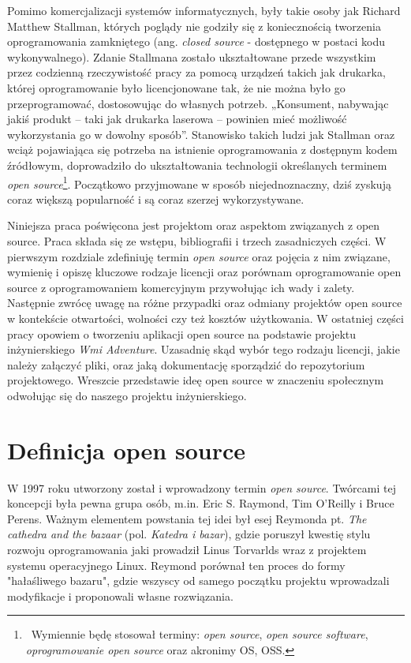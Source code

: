 \documentclass{article}
\begin{document}
Pomimo komercjalizacji systemów informatycznych, były takie osoby jak Richard Matthew Stallman, których poglądy nie godziły się z koniecznością tworzenia oprogramowania zamkniętego (ang. \emph{closed source} - dostępnego w postaci kodu wykonywalnego). Zdanie Stallmana zostało ukształtowane przede wszystkim przez codzienną rzeczywistość pracy za pomocą urządzeń takich jak drukarka, której oprogramowanie było licencjonowane tak, że nie można było go przeprogramować, dostosowując do własnych potrzeb. „Konsument, nabywając jakiś produkt – taki jak drukarka laserowa – powinien mieć możliwość wykorzystania go w dowolny sposób”\cite{Kotula}. Stanowisko takich ludzi jak Stallman oraz wciąż pojawiająca się potrzeba na istnienie oprogramowania z dostępnym kodem źródłowym, doprowadziło do ukształtowania technologii określanych terminem \emph{open source}\footnote{\, Wymiennie będę stosował terminy: \emph{open source}, \emph{open source software}, \emph{oprogramowanie open source} oraz akronimy OS, OSS.}. Początkowo przyjmowane w sposób niejednoznaczny, dziś zyskują coraz większą popularność i są coraz szerzej wykorzystywane\cite{Kotula}. 

Niniejsza praca poświęcona jest projektom oraz aspektom związanych z open source. Praca składa się ze wstępu, bibliografii i trzech zasadniczych części. W pierwszym rozdziale zdefiniuję termin \emph{open source} oraz pojęcia z nim związane, wymienię i opiszę kluczowe rodzaje licencji oraz porównam oprogramowanie open source z oprogramowaniem komercyjnym przywołując ich wady i zalety. Następnie zwrócę uwagę na różne przypadki oraz odmiany projektów open source w kontekście otwartości, wolności czy też kosztów użytkowania. W ostatniej części pracy opowiem o tworzeniu aplikacji open source na podstawie projektu inżynierskiego \emph{Wmi Adventure}. Uzasadnię skąd wybór tego rodzaju licencji, jakie należy załączyć pliki, oraz jaką dokumentację sporządzić do repozytorium projektowego. Wreszcie przedstawie ideę open source w znaczeniu społecznym odwołując się do naszego projektu inżynierskiego.

\newpage
\section{Definicja open source}

\hspace{4mm} W 1997 roku utworzony został i wprowadzony termin \emph{open source}. Twórcami tej koncepcji była pewna grupa osób, m.in. Eric S. Raymond, Tim O'Reilly i Bruce Perens. Ważnym elementem powstania tej idei był esej Reymonda pt. \emph{The cathedra and the bazaar} (pol. \emph{Katedra i bazar}), gdzie poruszył kwestię stylu rozwoju oprogramowania jaki prowadził Linus Torvarlds wraz z projektem systemu operacyjnego Linux. Reymond porównał ten proces do formy "hałaśliwego bazaru", gdzie wszyscy od samego początku projektu wprowadzali modyfikacje i proponowali własne rozwiązania\cite{Kotula}.  
\end{document}
